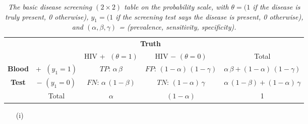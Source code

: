\documentclass[12pt]{article}
\begin{document}
\begin{itemize}
\begin{table}[t!]

\centering

\caption{\textit{The basic disease screening $( 2 \times 2 )$ table on the probability scale, with $\theta = ( 1$ if the disease is truly present, 0 otherwise), $y_1 = ( 1$ if the screening test says the disease is present, 0 otherwise), and $( \alpha, \beta, \gamma )$ = (prevalence, sensitivity, specificity).}}

\label{t:basic-screening-table}

\bigskip

\begin{tabular}{cc|c|c|c}

& \multicolumn{1}{c}{} & \multicolumn{2}{c}{\textbf{Truth}} \\

& \multicolumn{1}{c}{} & \multicolumn{1}{c}{HIV \textcircled{+} $( \theta = 1 )$} & \multicolumn{1}{c}{HIV \textcircled{$-$} $( \theta = 0 )$}  & Total \\ \cline{3-4}

\textbf{Blood} & \textcircled{+} $( y_1 = 1 )$ & $TP \! : \, \alpha \, \beta$ & $FP \! : \, ( 1 - \alpha ) \, ( 1 - \gamma )$ & $\alpha \, \beta + ( 1 - \alpha ) \, ( 1 - \gamma )$ \\ \cline{3-4}

\textbf{Test} & \textcircled{$-$} $( y_1 = 0 )$ & $FN \! : \, \alpha \, ( 1 - \beta )$ & $TN \! : \, ( 1 - \alpha ) \, \gamma$ & $\alpha \, ( 1 - \beta ) + ( 1 - \alpha ) \, \gamma$ \\ \cline{3-4}

& \multicolumn{1}{c}{Total} & \multicolumn{1}{c}{$\alpha$} & \multicolumn{1}{c}{$( 1 - \alpha )$} & 1

\end{tabular}

\end{table}

\begin{itemize}
\item[(i)]


\end{itemize}
\end{itemize}
\end{document}
